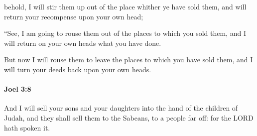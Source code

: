 			\begin{versebox}
					\item[BHS] 
					\item[LXX] 
					\item[ASV] behold, I will stir them up out of the place whither ye have sold them, and will return your recompense upon your own head;
					\item[NIV] “See, I am going to rouse them out of the places to which you sold them, and I will return on your own heads what you have done.
					\item[NRSV] But now I will rouse them to leave the places to which you have sold them, and I will turn your deeds back upon your own heads.
			\end{versebox}

		\paragraph{Joel 3:8} %
			\label{JOEL-3-8}

			And I will sell your sons and your daughters into the hand of the children of Judah, and they shall sell them to the Sabeans, to a people far off: for the LORD hath spoken it.

